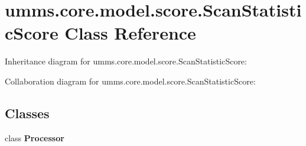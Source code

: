 \hypertarget{classumms_1_1core_1_1model_1_1score_1_1_scan_statistic_score}{\section{umms.\+core.\+model.\+score.\+Scan\+Statistic\+Score Class Reference}
\label{classumms_1_1core_1_1model_1_1score_1_1_scan_statistic_score}
}


Inheritance diagram for umms.\+core.\+model.\+score.\+Scan\+Statistic\+Score\+:


Collaboration diagram for umms.\+core.\+model.\+score.\+Scan\+Statistic\+Score\+:
\subsection*{Classes}
\begin{DoxyCompactItemize}
\item 
class {\bfseries Processor}
\end{DoxyCompactItemize}
